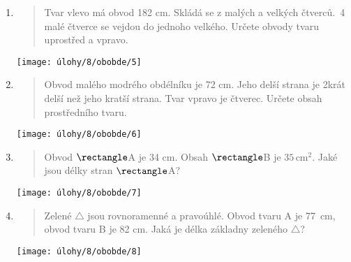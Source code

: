 \begin{enumerate}
\begin{minipage}[t]{\linewidth}
    \end{minipage}

    \item
    \begin{minipage}[t]{\linewidth}
        \begin{quote}
            Tvar vlevo má obvod 182 cm.
            Skládá se z malých a velkých čtverců.\ 4 malé čtverce se vejdou do jednoho velkého.
            Určete obvody tvaru uprostřed a vpravo.
        \end{quote}
        \centering
        \texttt{[image: úlohy/8/obobde/5]}

    \end{minipage}

    \item
    \begin{minipage}[t]{\linewidth}
        \begin{quote}
            Obvod malého modrého obdélníku je 72 cm.
            Jeho delší strana je 2krát delší než jeho kratší strana.
            Tvar vpravo je čtverec.
            Určete obsah prostředního tvaru.
        \end{quote}
        \centering
        \texttt{[image: úlohy/8/obobde/6]}

    \end{minipage}

    \item
    \begin{minipage}[t]{\linewidth}
        \begin{quote}
            Obvod $\rectangle$A je 34 cm.
            Obsah $\rectangle$B je $35\,\text{cm}^{2}$.
            Jaké jsou délky stran $\rectangle$A?
        \end{quote}
        \centering
        \texttt{[image: úlohy/8/obobde/7]}

    \end{minipage}

    \item
    \begin{minipage}[t]{\linewidth}
        \begin{quote}
            Zelené $\triangle$ jsou rovnoramenné a pravoúhlé.
            Obvod tvaru A je 77~cm, obvod tvaru B je 82 cm.
            Jaká je délka základny zeleného $\triangle$?
        \end{quote}
        \centering
        \texttt{[image: úlohy/8/obobde/8]}


\end{minipage}
\end{enumerate}
